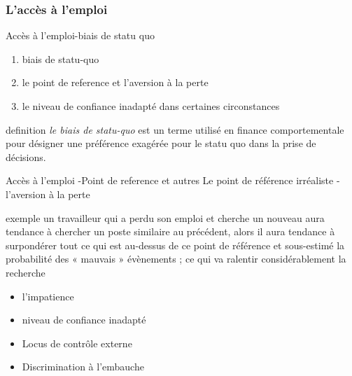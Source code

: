 \documentclass[serif]{beamer}
\begin{document}
\subsubsection{L'accès à l'emploi}
\begin{frame}{ Accès à l'emploi-biais de statu quo}
\begin{block}{}
	\begin{enumerate}
		\item biais de statu-quo
		\item le point de reference et l'aversion à la perte
		\item le niveau de confiance inadapté dans certaines circonstances 
	\end{enumerate}
\end{block}
\begin{exampleblock}{definition}
\textit{le biais de statu-quo} est un terme utilisé en finance comportementale pour désigner une préférence exagérée pour le statu quo dans la prise de décisions.
\end{exampleblock}
\end{frame}
\begin{frame}{ Accès à l'emploi -Point de reference et autres} Le point de référence irréaliste -l’aversion à la perte 
\begin{exampleblock}{exemple}
un travailleur qui a perdu son emploi et cherche un nouveau aura tendance à chercher un poste similaire au précédent, alors il aura tendance à surpondérer tout ce qui est au-dessus de ce point de référence et sous-estimé la probabilité des « mauvais » évènements ; ce qui va ralentir considérablement la recherche
\end{exampleblock}
\begin{itemize}
\item[\ding{82}]  l'impatience
\item[\ding{82}]  niveau de confiance inadapté
\item[\ding{82}]  Locus de contrôle externe
\item[\ding{82}]  Discrimination à l'embauche
\end{itemize}
\end{frame}

\end{document}
